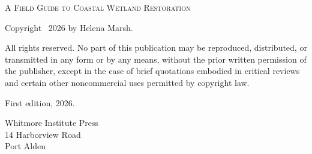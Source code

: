 \documentclass[a4paper]{article}
\begin{document}
\newpage

\thispagestyle{empty}

\vspace*{\fill}

\noindent\textsc{A Field Guide to Coastal Wetland Restoration}

\medskip
\noindent Copyright \textcopyright\ 2026 by Helena Marsh.

\medskip
\noindent All rights reserved. No part of this publication may be
reproduced, distributed, or transmitted in any form or by any means,
without the prior written permission of the publisher, except in the
case of brief quotations embodied in critical reviews and certain
other noncommercial uses permitted by copyright law.

\medskip
\noindent First edition, 2026.

\medskip
\noindent Whitmore Institute Press\\
14 Harborview Road\\
Port Alden

\vspace*{\fill}
\end{document}
